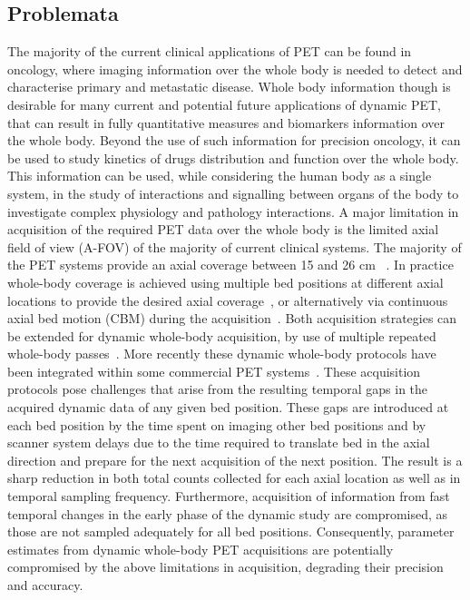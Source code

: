 \subsection*{Problemata}
The majority of the current clinical applications of PET can be found in oncology, where imaging information over the whole body is needed to detect and characterise primary and metastatic disease. 
Whole body information though is desirable for many current and potential future applications of dynamic PET, that can result in fully quantitative measures and biomarkers information over the whole body. Beyond the use of such information for precision oncology, it can be used to study kinetics of drugs distribution and function over the whole body.
This information can be used, while considering the human body as a single system, in the study of interactions and signalling between organs of the body to investigate complex physiology and pathology interactions.
A major limitation in acquisition of the required PET data over the whole body is the limited axial field of view (A-FOV) of the majority of current clinical systems. The majority of the PET systems provide an axial coverage between 15 and 26 cm ~\cite{Vandenberghe2020}. 
In practice whole-body coverage is achieved using multiple bed positions at different axial locations to provide the desired axial coverage~\cite{Schubert1996}, or alternatively via continuous axial bed motion (CBM) during the acquisition~\cite{Panin2014}. 
Both acquisition strategies can be extended for dynamic whole-body acquisition, by use of multiple repeated whole-body passes~\cite {Karakatsanis2011,Karakatsanis2013,Rahmim2019}.
More recently these dynamic whole-body protocols have been integrated within some commercial PET systems~\cite{Hu2020}. 
These acquisition protocols pose challenges that arise from the resulting temporal gaps in the acquired dynamic data of any given bed position. These gaps are introduced at each bed position by the time spent on imaging other bed positions and by scanner system delays due to the time required to translate bed in the axial direction and prepare for the next acquisition of the next position. The result is a sharp reduction in both total counts collected for each axial location as well as in temporal sampling frequency. Furthermore, acquisition of information from fast temporal changes in the early phase of the dynamic study are compromised, as those are not sampled adequately for all bed positions. Consequently, parameter estimates from dynamic whole-body PET acquisitions are potentially compromised by the above limitations in acquisition, degrading their precision and accuracy.
